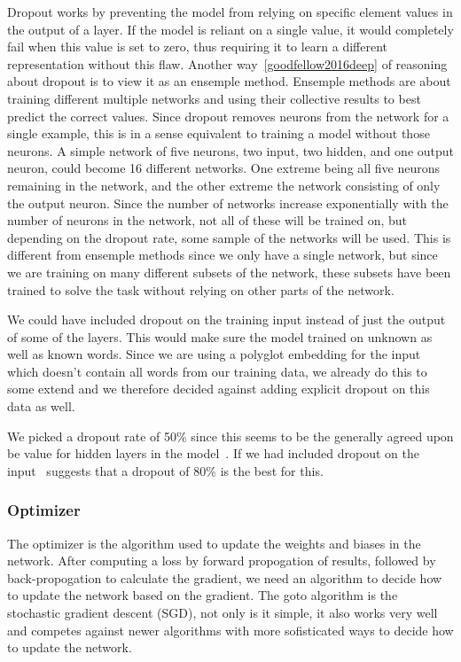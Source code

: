 Dropout works by preventing the model from relying on specific element values in
the output of a layer. If the model is reliant on a single value, it would
completely fail when this value is set to zero, thus requiring it to learn a
different representation without this flaw. Another way~\ref{goodfellow2016deep}
of reasoning about dropout is to view it as an ensemple method. Ensemple methods
are about training different multiple networks and using their collective
results to best predict the correct values. Since dropout removes neurons from
the network for a single example, this is in a sense equivalent to training a
model without those neurons. A simple network of five neurons, two input, two
hidden, and one output neuron, could become 16 different networks. One extreme
being all five neurons remaining in the network, and the other extreme the
network consisting of only the output neuron. Since the number of networks
increase exponentially with the number of neurons in the network, not all of
these will be trained on, but depending on the dropout rate, some sample of the
networks will be used. This is different from ensemple methods since we only
have a single network, but since we are training on many different subsets of
the network, these subsets have been trained to solve the task without relying
on other parts of the network. 

We could have included dropout on the training input instead of just the output
of some of the layers. This would make sure the model trained on unknown as well
as known words. Since we are using a polyglot embedding for the input which
doesn't contain all words from our training data, we already do this to some
extend and we therefore decided against adding explicit dropout on this data as
well.

We picked a dropout rate of 50\% since this seems to be the generally agreed
upon be value for hidden layers in the model~\cite{}. If we had included dropout
on the input~\cite{} suggests that a dropout of 80\% is the best for this.


\subsubsection{Optimizer}

The optimizer is the algorithm used to update the weights and biases in the
network. After computing a loss by forward propogation of results, followed by
back-propogation to calculate the gradient, we need an algorithm to decide how
to update the network based on the gradient. The goto algorithm is the
stochastic gradient descent (SGD), not only is it simple, it also works very
well and competes against newer algorithms with more sofisticated ways to decide
how to update the network.


